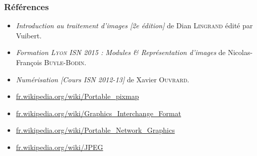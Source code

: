 \documentclass{beamer}
\begin{document}
\begin{frame}
	\frametitle{Références}

	\begin{itemize}
		\item \textit{\og{}Introduction au traitement d'images [2\textup{e} édition]\fg{}} de Dian \textsc{Lingrand} édité par Vuibert.

		\item \textit{\og{}Formation \textsc{\textit{Lyon}} ISN 2015 : Modules \& Représentation d'images\fg{}} de Nicolas-François \textsc{Buyle-Bodin}.

		\item \textit{\og{}Numérisation [Cours ISN 2012-13]\fg{}} de Xavier \textsc{Ouvrard}.
		
		\item \url{fr.wikipedia.org/wiki/Portable_pixmap}
		
		\item \url{fr.wikipedia.org/wiki/Graphics_Interchange_Format}
		
		\item \url{fr.wikipedia.org/wiki/Portable_Network_Graphics}
		
		\item \url{fr.wikipedia.org/wiki/JPEG}
	\end{itemize}
\end{frame}
 
\end{document}
